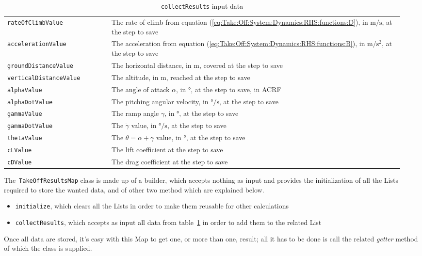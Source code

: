 \begin{table}[!t]
{\begin{tabular}{p{0.25\linewidth}p{0.7\linewidth}}
\lstinline[language=Java]!rateOfClimbValue! & The rate of climb from equation (\ref{eq:Take:Off:System:Dynamics:RHS:functions:D}), in  $\si{\meter\per\second}$, at the step to save \\  [0.2cm]
\lstinline[language=Java]!accelerationValue! & The acceleration from equation (\ref{eq:Take:Off:System:Dynamics:RHS:functions:B}), in  $\si{\meter\per\square\second}$, at the step to save \\  [0.2cm]
\lstinline[language=Java]!groundDistanceValue! & The horizontal distance, in  $\si{\meter}$, covered at the step to save \\ [0.2cm]
\lstinline[language=Java]!verticalDistanceValue! & The altitude, in  $\si{\meter}$, reached at the step to save \\ [0.2cm]
\lstinline[language=Java]!alphaValue! & The angle of attack $\alpha$, in  $\si{\degree}$, at the step to save, in \gls{ACRF} \\ [0.2cm]
\lstinline[language=Java]!alphaDotValue! & The pitching angular velocity, in  $\si{\degree\per\second}$, at the step to save \\ [0.2cm]
\lstinline[language=Java]!gammaValue! & The ramp angle $\gamma$, in  $\si{\degree}$, at the step to save  \\ [0.2cm]
\lstinline[language=Java]!gammaDotValue! & The $\dot\gamma$ value, in  $\si{\degree\per\second}$, at the step to save \\ [0.2cm]
\lstinline[language=Java]!thetaValue! & The $\theta=\alpha+\gamma$ value, in  $\si{\degree}$, at the step to save \\ [0.2cm]
\lstinline[language=Java]!cLValue! & The lift coefficient at the step to save \\ [0.2cm]
\lstinline[language=Java]!cDValue! & The drag coefficient at the step to save \\ 
\bottomrule
\end{tabular}
}
\caption{\lstinline[language=Java]!collectResults! input data}
\label{table:TakeOffMapInput}
\end{table}

\bigskip
\noindent
The~\lstinline[language=Java]!TakeOffResultsMap! class is made up of a builder, which accepts nothing as input and provides the initialization of all the \gls{List}s required to store the wanted data, and of other two method which are explained below.
%
\begin{itemize}
\item \lstinline[language=Java]!initialize!, which clears all the \gls{List}s in order to make them reusable for other calculations
\item \lstinline[language=Java]!collectResults!, which accepts as input all data from table~\ref{table:TakeOffMapInput} in order to add them to the related \gls{List}
\end{itemize}
%
Once all data are stored, it's easy with this \gls{Map} to get one, or more than one, result; all it has to be done is call the related \emph{getter} method of which the class is supplied. 

